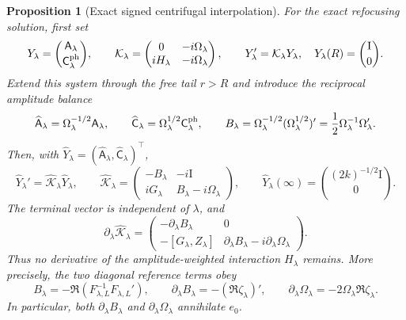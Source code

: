 \documentclass[11pt]{article}
\newcommand{\Id}{\mathrm I}
\newtheorem{proposition}[theorem]{Proposition}
\theoremstyle{definition}
\theoremstyle{remark}
\begin{document}
\begin{proposition}[Exact signed centrifugal interpolation]
For the exact refocusing solution, first set
\begin{equation}
 Y_\lambda=\binom{\mathsf A_\lambda}{\mathsf C_\lambda^{\rm ph}},
 \qquad
 \mathcal K_\lambda=
 \begin{pmatrix}
  0&-i\Omega_\lambda\\
  iH_\lambda&-i\Omega_\lambda
 \end{pmatrix},
 \qquad
 Y_\lambda'=\mathcal K_\lambda Y_\lambda,
 \quad Y_\lambda(R)=\binom{\Id}{0}.
 \label{eq:centrifugal-doubled-system}
\end{equation}
Extend this system through the free tail $r>R$ and introduce the reciprocal
amplitude balance
\begin{equation}
 \widehat{\mathsf A}_\lambda
   =\Omega_\lambda^{-1/2}\mathsf A_\lambda,
 \qquad
 \widehat{\mathsf C}_\lambda
   =\Omega_\lambda^{1/2}\mathsf C_\lambda^{\rm ph},
 \qquad
 B_\lambda
   =\Omega_\lambda^{-1/2}(\Omega_\lambda^{1/2})'
   =\frac12\Omega_\lambda^{-1}\Omega_\lambda'.
 \label{eq:reciprocal-amplitude-balance}
\end{equation}
Then, with $\widehat Y_\lambda
=(\widehat{\mathsf A}_\lambda,\widehat{\mathsf C}_\lambda)^\top$,
\begin{equation}
 \widehat Y_\lambda'
 =\widehat{\mathcal K}_\lambda\widehat Y_\lambda,
 \qquad
 \widehat{\mathcal K}_\lambda=
 \begin{pmatrix}
  -B_\lambda&-i\Id\\
  iG_\lambda&B_\lambda-i\Omega_\lambda
 \end{pmatrix},
 \qquad
 \widehat Y_\lambda(\infty)
 =\binom{(2k)^{-1/2}\Id}{0}.
 \label{eq:fully-balanced-doubled-system}
\end{equation}
The terminal vector is independent of $\lambda$, and
\begin{equation}
 \boxed{
 \partial_\lambda\widehat{\mathcal K}_\lambda
 =\begin{pmatrix}
  -\partial_\lambda B_\lambda&0\\
  -[G_\lambda,Z_\lambda]&
  \partial_\lambda B_\lambda-i\partial_\lambda\Omega_\lambda
 \end{pmatrix}.}
 \label{eq:fully-balanced-generator-variation}
\end{equation}
Thus no derivative of the amplitude-weighted interaction $H_\lambda$ remains.
More precisely, the two diagonal reference terms obey
\begin{equation}
 B_\lambda=-\Re(F_{\lambda,L}^{-1}F_{\lambda,L}'),
 \qquad
 \partial_\lambda B_\lambda=-(\Re\zeta_\lambda)',
 \qquad
 \partial_\lambda\Omega_\lambda=-2\Omega_\lambda\Re\zeta_\lambda.
 \label{eq:diagonal-reference-drift-identities}
\end{equation}
In particular, both $\partial_\lambda B_\lambda$ and
$\partial_\lambda\Omega_\lambda$ annihilate $e_0$.


\end{proposition}
\end{document}
